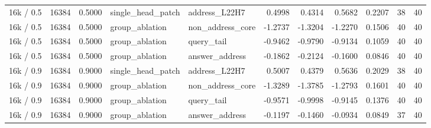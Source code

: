 \begin{tabular}{lrrllrrrrrr}
16k / 0.5 & 16384 & 0.5000 & single_head_patch & address_L22H7 & 0.4998 & 0.4314 & 0.5682 & 0.2207 & 38 & 40 \\
16k / 0.5 & 16384 & 0.5000 & group_ablation & non_address_core & -1.2737 & -1.3204 & -1.2270 & 0.1506 & 40 & 40 \\
16k / 0.5 & 16384 & 0.5000 & group_ablation & query_tail & -0.9462 & -0.9790 & -0.9134 & 0.1059 & 40 & 40 \\
16k / 0.5 & 16384 & 0.5000 & group_ablation & answer_address & -0.1862 & -0.2124 & -0.1600 & 0.0846 & 40 & 40 \\
16k / 0.9 & 16384 & 0.9000 & single_head_patch & address_L22H7 & 0.5007 & 0.4379 & 0.5636 & 0.2029 & 38 & 40 \\
16k / 0.9 & 16384 & 0.9000 & group_ablation & non_address_core & -1.3289 & -1.3785 & -1.2793 & 0.1601 & 40 & 40 \\
16k / 0.9 & 16384 & 0.9000 & group_ablation & query_tail & -0.9571 & -0.9998 & -0.9145 & 0.1376 & 40 & 40 \\
16k / 0.9 & 16384 & 0.9000 & group_ablation & answer_address & -0.1197 & -0.1460 & -0.0934 & 0.0849 & 37 & 40 \\
\bottomrule
\end{tabular}
